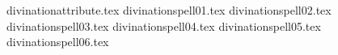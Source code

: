 


\tablepassive{\divinationpassive}{\divinationpassivedef}
\tablelabels
{divinationattribute.tex}%
\spellrule
{divinationspell01.tex}%
\spellrule
{divinationspell02.tex}%
\spellrule
{divinationspell03.tex}%
\spellrule
{divinationspell04.tex}%
\spellrule
{divinationspell05.tex}%
\spellrule
{divinationspell06.tex}%
\closetable{}
